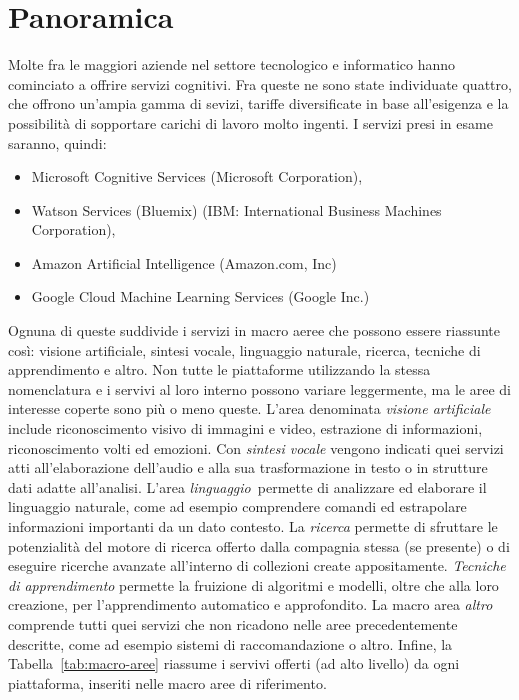 
\section{Panoramica}\label{sec:panoramica}
Molte fra le maggiori aziende nel settore tecnologico e informatico hanno cominciato a offrire servizi cognitivi.
%
Fra queste ne sono state individuate quattro, che offrono un'ampia gamma di sevizi, tariffe diversificate in base all'esigenza e la possibilità di sopportare carichi di lavoro molto ingenti.
I servizi presi in esame saranno, quindi:
\begin{itemize}
\item Microsoft Cognitive Services \cite{microsoft-link} (Microsoft Corporation),
\item Watson Services (Bluemix) \cite{ibm-link} (IBM: International Business Machines Corporation),
\item Amazon Artificial Intelligence \cite{amazon-link} (Amazon.com, Inc)
\item Google Cloud Machine Learning Services \cite{google-link} (Google Inc.)
\end{itemize}

Ognuna di queste suddivide i servizi in macro aeree che possono essere riassunte così: visione artificiale, sintesi vocale, linguaggio naturale, ricerca, tecniche di apprendimento e altro.
Non tutte le piattaforme utilizzando la stessa nomenclatura e i servivi al loro interno possono variare leggermente, ma le aree di interesse coperte sono più o meno queste.
L'area denominata \textit{visione artificiale} include riconoscimento visivo di immagini e video, estrazione di informazioni, riconoscimento volti ed emozioni.
Con \textit{sintesi vocale} vengono indicati quei servizi atti all'elaborazione dell'audio e alla sua trasformazione in testo o in strutture dati adatte all'analisi.
L'area \textit{linguaggio} permette di analizzare ed elaborare il linguaggio naturale, come ad esempio comprendere comandi ed estrapolare informazioni importanti da un dato contesto.
La \textit{ricerca} permette di sfruttare le potenzialità del motore di ricerca offerto dalla compagnia stessa (se presente) o di eseguire ricerche avanzate all'interno di collezioni create appositamente.
\textit{Tecniche di apprendimento} permette la fruizione di algoritmi e modelli, oltre che alla loro creazione, per l'apprendimento automatico e approfondito.
La macro area \textit{altro} comprende tutti quei servizi che non ricadono nelle aree precedentemente descritte, come ad esempio sistemi di raccomandazione o altro.
Infine, la Tabella~\ref{tab:macro-aree} riassume i servivi offerti (ad alto livello) da ogni piattaforma, inseriti nelle macro aree di riferimento.

